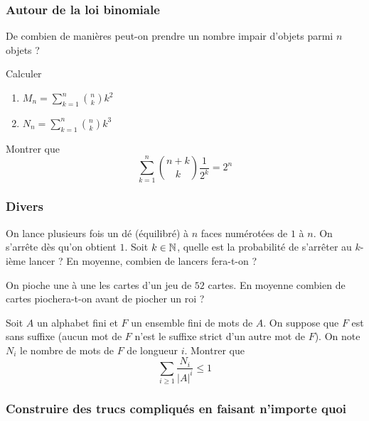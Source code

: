 \subsubsection{Autour de la loi binomiale}


\begin{exo}
De combien de manières peut-on prendre un nombre impair d'objets parmi $n$ objets ?
\end{exo}


\begin{exo}
Calculer
\begin{enumerate}
\item $M_n = \sum_{k = 1}^n\binom n k k^2$
\item $N_n = \sum_{k = 1}^n\binom n k k^3$
\end{enumerate}
\end{exo}


\begin{exo}
Montrer que
$$\sum_{k = 1}^n\binom{n + k} k\frac 1{2^k} = 2^n$$
\end{exo}


\subsubsection{Divers}


\begin{exo}
On lance plusieurs fois un dé (équilibré) à $n$ faces numérotées de $1$ à $n$. On s'arrête dès qu'on obtient $1$. Soit $k\in\mathbb N$, quelle est la probabilité de s'arrêter au $k$-ième lancer ? En moyenne, combien de lancers fera-t-on ?
\end{exo}


\begin{exo}
On pioche une à une les cartes d'un jeu de $52$ cartes. En moyenne combien de cartes piochera-t-on avant de piocher un roi ?
\end{exo}


\begin{exo}
Soit $A$ un alphabet fini et $F$ un ensemble fini de mots de $A$. On suppose que $F$ est sans suffixe (aucun mot de $F$ n'est le suffixe strict d'un autre mot de $F$). On note $N_i$ le nombre de mots de $F$ de longueur $i$. Montrer que
$$\sum_{i\ge1}\frac{N_i}{|A|^i}\le1$$
\end{exo}


\subsubsection{Construire des trucs compliqués en faisant n'importe quoi}


